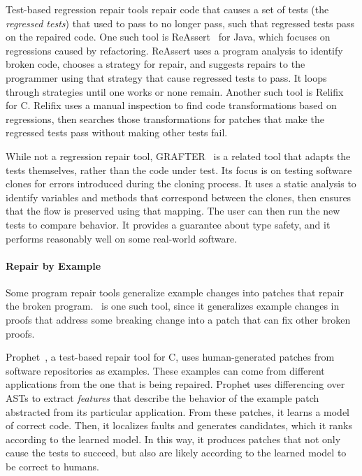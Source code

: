 Test-based regression repair tools repair code that causes a set of tests (the \textit{regressed tests}) that used to pass to no longer pass,
such that regressed tests pass on the repaired code.
One such tool is ReAssert~\cite{daniel2009reassert} for Java,
which focuses on regressions caused by refactoring.
ReAssert uses a program analysis to identify broken code,
chooses a strategy for repair, and suggests repairs to the programmer using that strategy that cause regressed tests to pass.
It loops through strategies until one works or none remain.
Another such tool is Relifix~\cite{Tan:2015:RAR:2818754.2818813} for C.
Relifix uses a manual inspection to find code transformations based on regressions, then searches those transformations for 
patches that make the regressed tests pass without making other tests fail. %

While not a regression repair tool, GRAFTER~\cite{Zhang:2017:ATD:3097368.3097448} is a related tool that adapts the tests themselves,
rather than the code under test. Its focus is on testing software clones for errors introduced during the
cloning process. It uses a static analysis to identify variables and methods that correspond between the clones,
then ensures that the flow is preserved using that mapping. The user can then run the new tests to compare behavior.
It provides a guarantee about type safety, and it performs reasonably well on some real-world software.

\paragraph{Repair by Example} %
Some program repair tools generalize example changes into patches that repair the broken program.
\sysname\ is one such tool, since it generalizes example changes in proofs that address some breaking change
into a patch that can fix other broken proofs. 

Prophet~\cite{Long:2016:APG:2837614.2837617}, a test-based
repair tool for C,
uses human-generated patches from software repositories as examples.
These examples can come from different applications from the one that is being repaired.
Prophet uses differencing over ASTs %
to extract \textit{features} that describe the behavior of the example patch abstracted from its particular application. %
From these patches, it learns a model of correct code. Then,
it localizes faults and generates candidates, which it ranks according to the learned model.
In this way, it produces patches that not only cause the tests to succeed, but also
are likely according to the learned model to be correct to humans. %


